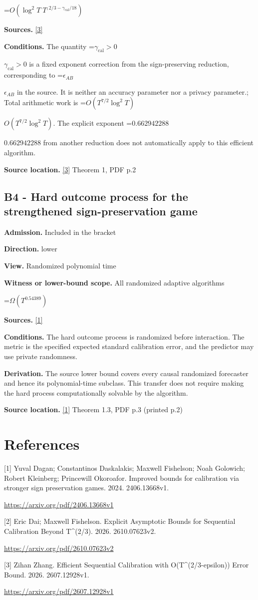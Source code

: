 \documentclass[10pt,a4paper]{article}
\newcommand{\AtlasMath}[1]{\par\begingroup\centering\setbox0=\hbox{$\displaystyle #1$}\ifdim\wd0>1.4\linewidth\typeout{ATLAS WIDE FORMULA: \the\wd0}\fi\ifdim\wd0>\linewidth\resizebox{\linewidth}{!}{\box0}\else\box0\fi\par\endgroup}
\newcommand{\AtlasInlineMath}[1]{\begingroup\setbox0=\hbox{$#1$}\ifdim\wd0>.4\linewidth\endgroup\AtlasMath{#1}\else\endgroup$#1$\fi}
\begin{document}
\AtlasMath{O\!\left(\log^2T\;T^{,2/3-\gamma_{\mathrm{cal}}/18}\right)}
\textbf{Sources.} \href{https://arxiv.org/pdf/2607.12928v1}{[3]}

\textbf{Conditions.} The quantity \AtlasInlineMath{\gamma_{\mathrm{cal}}>0} is a fixed exponent correction from the sign-preserving reduction, corresponding to \AtlasInlineMath{\epsilon_{AB}} in the source. It is neither an accuracy parameter nor a privacy parameter.; Total arithmetic work is \AtlasInlineMath{O(T^{7/2}\log^2T)}. The explicit exponent \AtlasInlineMath{0.662942288} from another reduction does not automatically apply to this efficient algorithm.

\textbf{Source location.} \href{https://arxiv.org/pdf/2607.12928v1}{[3]} Theorem 1, PDF p.2

\subsection{B4 - Hard outcome process for the strengthened sign-preservation game}
\textbf{Admission.} Included in the bracket

\textbf{Direction.} lower

\textbf{View.} Randomized polynomial time

\textbf{Witness or lower-bound scope.} All randomized adaptive algorithms

\AtlasMath{\Omega\!\left(T^{0.54389}\right)}
\textbf{Sources.} \href{https://arxiv.org/pdf/2406.13668v1}{[1]}

\textbf{Conditions.} The hard outcome process is randomized before interaction. The metric is the specified expected standard calibration error, and the predictor may use private randomness.

\textbf{Derivation.} The source lower bound covers every causal randomized forecaster and hence its polynomial-time subclass. This transfer does not require making the hard process computationally solvable by the algorithm.

\textbf{Source location.} \href{https://arxiv.org/pdf/2406.13668v1}{[1]} Theorem 1.3, PDF p.3 (printed p.2)

\section{References}
[1] Yuval Dagan; Constantinos Daskalakis; Maxwell Fishelson; Noah Golowich; Robert Kleinberg; Princewill Okoroafor. Improved bounds for calibration via stronger sign preservation games. 2024. 2406.13668v1.

\url{https://arxiv.org/pdf/2406.13668v1}

[2] Eric Dai; Maxwell Fishelson. Explicit Asymptotic Bounds for Sequential Calibration Beyond T\textasciicircum{}(2/3). 2026. 2610.07623v2.

\url{https://arxiv.org/pdf/2610.07623v2}

[3] Zihan Zhang. Efficient Sequential Calibration with O(T\textasciicircum{}(2/3-epsilon)) Error Bound. 2026. 2607.12928v1.

\url{https://arxiv.org/pdf/2607.12928v1}
\end{document}
